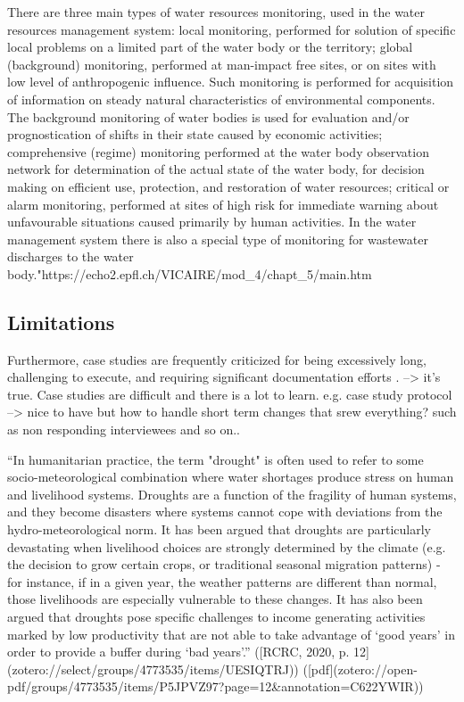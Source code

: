 There are three main types of water resources monitoring, used in the water resources management system:
local monitoring, performed for solution of specific local problems on a limited part of the water body or the territory;
global (background) monitoring, performed at man-impact free sites, or on sites with low level of anthropogenic influence. Such monitoring is performed for acquisition of information on steady natural characteristics of environmental components. The background monitoring of water bodies is used for evaluation and/or prognostication of shifts in their state caused by economic activities;
comprehensive (regime) monitoring performed at the water body observation network for determination of the actual state of the water body, for decision making on efficient use, protection, and restoration of water resources;
critical or alarm monitoring, performed at sites of high risk for immediate warning about unfavourable situations caused primarily by human activities.
In the water management system there is also a special type of monitoring for wastewater discharges to the water body."https://echo2.epfl.ch/VICAIRE/mod_4/chapt_5/main.htm



\subsection{Limitations}

Furthermore, case studies are frequently criticized for being excessively long, challenging to execute, and requiring significant documentation efforts \autocite{yinCaseStudyResearch1984}.
-->
it's true. Case studies are difficult and there is a lot to learn.
e.g. case study protocol --> nice to have but how to handle short term changes that srew everything? such as non responding interviewees and so on.. 


“In humanitarian practice, the term "drought" is often used to refer to some socio-meteorological combination where water shortages produce stress on human and livelihood systems. Droughts are a function of the fragility of human systems, and they become disasters where systems cannot cope with deviations from the hydro-meteorological norm. It has been argued that droughts are particularly devastating when livelihood choices are strongly determined by the climate (e.g. the decision to grow certain crops, or traditional seasonal migration patterns) - for instance, if in a given year, the weather patterns are different than normal, those livelihoods are especially vulnerable to these changes. It has also been argued that droughts pose specific challenges to income generating activities marked by low productivity that are not able to take advantage of ‘good years’ in order to provide a buffer during ‘bad years’.” ([RCRC, 2020, p. 12](zotero://select/groups/4773535/items/UESIQTRJ)) ([pdf](zotero://open-pdf/groups/4773535/items/P5JPVZ97?page=12&annotation=C622YWIR))



